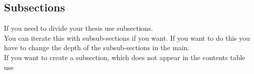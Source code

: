 \subsection{Subsections}
If you need to divide your thesis  use subsections.\\
You can iterate this with subsub-sections if you want. If you want to do this you have to change the depth of the subsub-sections in the main.\\
If you want to create a subsection, which does not appear in the contents table use 
